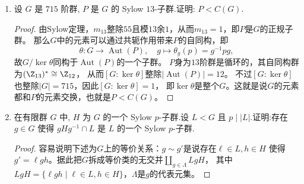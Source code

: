 \begin{enumerate}
\begin{proof}
    设$G$为$pqr$阶群，由Sylow定理，(i) $m_r$整除$pq$且模$r$余$1$，则$m_r=1$或$pq$，
    (ii) $m_q$整除$pr$且模$q$余$1$，则$m_q=1$或$r$或$pr$，
    (iii) $m_p$整除$qr$，则$m_p=1$或$q$或$r$或$pr$。
    若$m_r,m_q,m_p$中有哪个是$1$就完事了，下面假定三者都大于$1$，要推出矛盾。

    首先，$G$的$pq$个Sylow $r$-子群两两之间的共用元素只有单位元$e$，
    这些子群占据了除了$e$外的$pq(r-1)$个元素；
    接着，Sylow $q$-子群不少于$r$个，占据了除了$e$外的不少于$r(q-1)$个元素；
    再者，Sylow $p$-子群不少于$q$个，占据了除了$e$外的不少于$q(p-1)$个元素。
    这样一来，$G$起码要有$pq(r-1)+r(q-1)+q(p-1)+1=pqr+(r-1)(q-1)>pqr$个元素，
    再精打细算也不够用。

    本题至此就做出来了，不过上面的放缩是比较宽松的，改进后能得出更确切的结果。
    事实上假定$m_r,m_q$都大于$1$就能推出矛盾了，
    这时$G$起码有$pq(r-1)+r(q-1)+p=pqr+(r-p)(q-1)>pqr$个元素。
    这也就是说，$G$的Sylow $r$-子群和Sylow $q$-子群至少有一个是正规的。

    更进一步，甚至能说明$G$的Sylow $r$-子群必定正规。
    记$R$是$G$的某个$r$阶子群，$Q$是$G$的某个$q$阶子群，
    现在已知$R,Q$之一是正规子群，那么只需要考虑$Q$正规的情况。
    这时商去$Q$得到$pr$阶群$G/Q$，由Cauchy定理知$G/Q$有$r$阶子群$H/Q$，
    则$H$是$G$的$qr$阶子群，进而第7节习题4说明$H$是$G$的正规子群。
    接着$H$又有$r$阶子群$N$，可以说明$N$是$G$的正规Sylow $r$-子群。
    这是因为对$g \in G$，注意到$gNg^{-1}$同样是$gHg^{-1}=H$的子群，
    并且$H$的Sylow $r$-子群是唯一的，从而有$gNg^{-1}=N$。
\end{proof}
\item 设 $G$ 是 $715$ 阶群, $P$ 是 $G$ 的 Sylow $13$-子群.证明: $P < C(G)$.
\begin{proof}
    由Sylow定理，$m_{13}$整除$55$且模$13$余$1$，从而$m_{13}=1$，即$P$是$G$的正规子群。
    那么$G$中的元素可以通过共轭作用带来$P$的自同构，即
    \[\theta:G\to\operatorname{Aut}(P), \quad g\mapsto\theta_g(p)=g^{-1}pg,\]
    故$G/\ker\theta$同构于$\operatorname{Aut}(P)$的一个子群。
    $P$身为$13$阶群是循环的，其自同构群为$(\Z_{13})^*\cong\Z_{12}$，
    从而$[G:\ker\theta]$整除$|\operatorname{Aut}(P)|=12$。
    不过$[G:\ker\theta]$也整除$|G|=715$，因此$[G:\ker\theta]=1$，
    即$\ker\theta$是整个$G$。这就是说$G$的元素都和$P$的元素交换，也就是$P<C(G)$。
\end{proof}
\item 在有限群 $G$ 中, $H$ 为 $G$ 的一个 Sylow $p$-子群.设 $L<G$ 且 $p \mid |L|$.证明:存在 $g \in G$ 使得 $gHg^{-1} \cap L$ 是 $L$ 的一个 Sylow $p$-子群.
\begin{proof}
    容易说明下述为$G$上的等价关系：$g \sim g'$是说存在$\ell \in L,h \in H$
    使得$g'=\ell gh$。据此把$G$拆成等价类的无交并$\coprod\limits_{g\in\varLambda}LgH$，
    其中$LgH=\{\ell gh\mid\ell \in L,h \in H\}$，$\varLambda$是$g$的代表元集。


\end{proof}
\end{enumerate}
